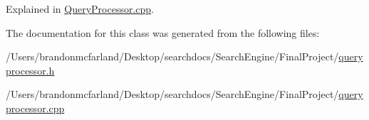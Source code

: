 Explained in \hyperlink{queryprocessor_8cpp}{Query\+Processor.\+cpp}. 



The documentation for this class was generated from the following files\+:\begin{DoxyCompactItemize}
\item 
/\+Users/brandonmcfarland/\+Desktop/searchdocs/\+Search\+Engine/\+Final\+Project/\hyperlink{queryprocessor_8h}{queryprocessor.\+h}\item 
/\+Users/brandonmcfarland/\+Desktop/searchdocs/\+Search\+Engine/\+Final\+Project/\hyperlink{queryprocessor_8cpp}{queryprocessor.\+cpp}\end{DoxyCompactItemize}

